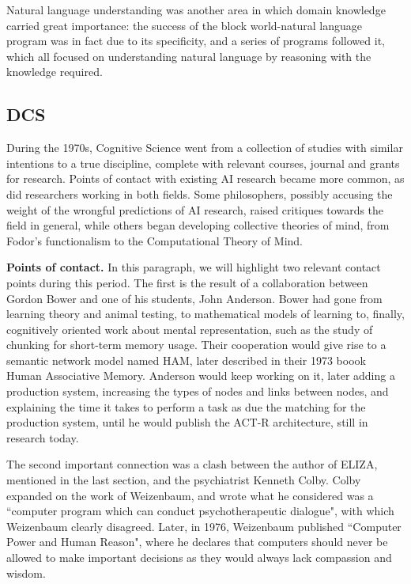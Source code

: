 \documentclass[../main.tex]{subfiles}
\begin{document}
Natural language understanding was another area in which domain knowledge carried great importance: the success of the block world-natural language program was in fact due to its specificity, and a series of programs followed it\cite{schankScriptsPlansGoals1977}\cite{wilenskyUnderstandingGoalbasedStories1978}\cite{schankComputerUnderstanding1981}, which all focused on understanding natural language by reasoning with the knowledge required.

\subsection{DCS}
During the 1970s, Cognitive Science went from a collection of studies with similar intentions to a true discipline, complete with relevant courses, journal and grants for research. Points of contact with existing AI research became more common, as did researchers working in both fields. Some philosophers, possibly accusing the weight of the wrongful predictions of AI research, raised critiques towards the field in general, while others began developing collective theories of mind, from Fodor's functionalism to the Computational Theory of Mind.

\vspace{4pt}
\textbf{Points of contact.}
In this paragraph, we will highlight two relevant contact points during this period. The first is the result of a collaboration between Gordon Bower and one of his students, John Anderson. Bower had gone from learning theory and animal testing, to mathematical models of learning to, finally, cognitively oriented work about mental representation, such as the study of chunking for short-term memory usage\cite{GordonBowerPsycNET}. Their cooperation would give rise to a semantic network model named HAM, later described in their 1973 boook Human Associative Memory\cite{andersonHumanAssociativeMemory1973}. Anderson would keep working on it, later adding a production system, increasing the types of nodes and links between nodes, and explaining the time it takes to perform a task as due the matching for the production system, until he would publish the ACT-R architecture, still in research today.

The second important connection was a clash between the author of ELIZA, mentioned in the last section, and the psychiatrist Kenneth Colby. Colby expanded on the work of Weizenbaum\cite{colbyComputerMethodPsychotherapy1966}, and wrote what he considered was a ``computer program which can conduct psychotherapeutic dialogue", with which Weizenbaum clearly disagreed. Later, in 1976, Weizenbaum published ``Computer Power and Human Reason"\cite{weizenbaumComputerPowerHuman1976}, where he declares that computers should never be allowed to make important decisions as they would always lack compassion and wisdom.
\end{document}
